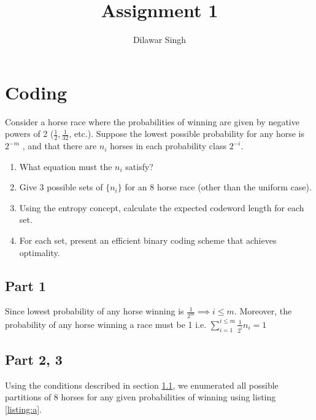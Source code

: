 \documentclass[a4paper,10pt]{article}
\title{Assignment 1}
\author{Dilawar Singh}
\begin{document}
\maketitle

\section{Coding}

Consider a horse race where the probabilities of winning are given by negative
powers of 2 ($\frac{1}{2}, \frac{1}{32}$, etc.). Suppose the lowest possible
probability for any horse is $2^{-m}$ , and that there are $n_i$ horses in each
probability class $2^{-i}$.

\begin{enumerate}
    \item What equation must the $n_i$ satisfy?  
    \item Give 3 possible sets of $\{n_i\}$ for an 8 horse race (other than the
        uniform case).
    \item Using the entropy concept, calculate the expected codeword length for
        each set.
    \item For each set, present an efficient binary coding scheme that achieves
        optimality.
\end{enumerate}


\subsection{Part 1}
\label{sec:parta}

Since lowest probability of any horse winning is $\frac{1}{2^m} \implies i \leq
m$. Moreover, the probability of any horse winning a race must be 1 i.e. $
\sum_{i=1}^{i \leq m} \frac{1}{2^i} n_i = 1 $

\subsection{Part 2, 3}

Using the conditions described in section \ref{sec:parta}, we enumerated all
possible partitions of 8 horses for any given probabilities of winning
using listing \ref{listing:a}.
\end{document}
